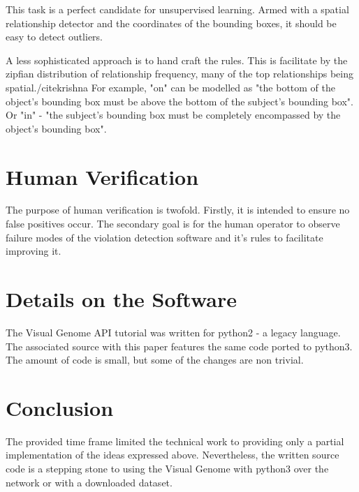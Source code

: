 \documentclass{article}
\begin{document}
This task is a perfect candidate for unsupervised learning.
Armed with a spatial relationship detector and the coordinates of the bounding boxes, it should be easy to detect outliers.

A less sophisticated approach is to hand craft the rules.
This is facilitate by the zipfian distribution of relationship frequency, many of the top relationships being spatial./cite{krishna} 
For example, "on" can be modelled as "the bottom of the object's bounding box must be above the bottom of the subject's bounding box".
Or "in" - "the subject's bounding box must be completely encompassed by the object's bounding box".


\section{Human Verification}
The purpose of human verification is twofold.
Firstly, it is intended to ensure no false positives occur.
The secondary goal is for the human operator to observe failure modes of the violation detection software and it's rules to facilitate improving it.


\section{Details on the Software}
The Visual Genome API tutorial was written for python2 - a legacy language.
The associated source with this paper features the same code ported to python3.
The amount of code is small, but some of the changes are non trivial.


\section{Conclusion}
The provided time frame limited the technical work to providing only a partial implementation of the ideas expressed above.
Nevertheless, the written source code is a stepping stone to using the Visual Genome with python3 over the network or with a downloaded dataset.
\end{document}
